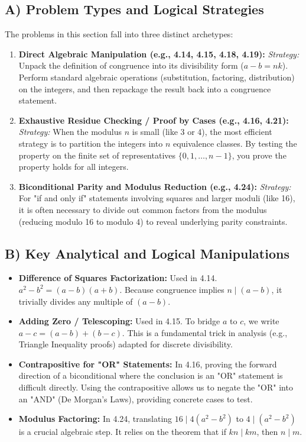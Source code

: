 \documentclass[11pt]{article}
\begin{document}
\subsection{A) Problem Types and Logical Strategies}
The problems in this section fall into three distinct archetypes:
\begin{enumerate}
    \item \textbf{Direct Algebraic Manipulation (e.g., 4.14, 4.15, 4.18, 4.19):} 
    \textit{Strategy:} Unpack the definition of congruence into its divisibility form ($a - b = nk$). Perform standard algebraic operations (substitution, factoring, distribution) on the integers, and then repackage the result back into a congruence statement.
    \item \textbf{Exhaustive Residue Checking / Proof by Cases (e.g., 4.16, 4.21):}
    \textit{Strategy:} When the modulus $n$ is small (like 3 or 4), the most efficient strategy is to partition the integers into $n$ equivalence classes. By testing the property on the finite set of representatives $\{0, 1, \dots, n-1\}$, you prove the property holds for all integers.
    \item \textbf{Biconditional Parity and Modulus Reduction (e.g., 4.24):}
    \textit{Strategy:} For "if and only if" statements involving squares and larger moduli (like 16), it is often necessary to divide out common factors from the modulus (reducing modulo 16 to modulo 4) to reveal underlying parity constraints.
\end{enumerate}

\subsection{B) Key Analytical and Logical Manipulations}
\begin{itemize}
    \item \textbf{Difference of Squares Factorization:} Used in 4.14. $a^2 - b^2 = (a-b)(a+b)$. Because congruence implies $n \mid (a-b)$, it trivially divides any multiple of $(a-b)$.
    \item \textbf{Adding Zero / Telescoping:} Used in 4.15. To bridge $a$ to $c$, we write $a - c = (a - b) + (b - c)$. This is a fundamental trick in analysis (e.g., Triangle Inequality proofs) adapted for discrete divisibility.
    \item \textbf{Contrapositive for "OR" Statements:} In 4.16, proving the forward direction of a biconditional where the conclusion is an "OR" statement is difficult directly. Using the contrapositive allows us to negate the "OR" into an "AND" (De Morgan's Laws), providing concrete cases to test.
    \item \textbf{Modulus Factoring:} In 4.24, translating $16 \mid 4(a^2 - b^2)$ to $4 \mid (a^2 - b^2)$ is a crucial algebraic step. It relies on the theorem that if $kn \mid km$, then $n \mid m$.
\end{itemize}
\end{document}
